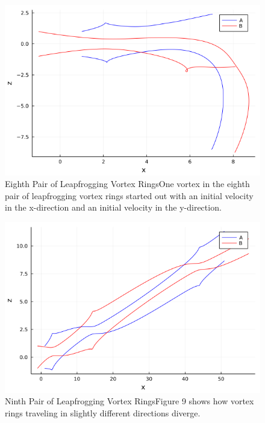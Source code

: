 \documentclass{article}
\begin{document}
\begin{figure}[htb]
	\centering
	\includegraphics[width=\textwidth]{Graph_E.png}
	\caption{Eighth Pair of Leapfrogging Vortex Rings\newline One vortex in the eighth pair of leapfrogging vortex rings started out with an initial velocity in the x-direction and an initial velocity in the y-direction.}
	\label{fig:vortexpaths8}
\end{figure} 

\begin{figure}[htb]
	\centering
	\includegraphics[width=\textwidth]{Graph_F.png}
	\caption{Ninth Pair of Leapfrogging Vortex Rings\newline Figure 9 shows how vortex rings traveling in slightly different directions diverge.}
	\label{fig:vortexpaths9}
\end{figure} 
\end{document}
